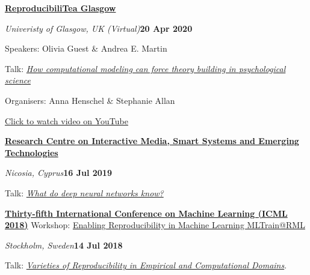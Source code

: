 \documentclass[10pt]{article}
\newenvironment{outerlist}[1][\enskip\textbullet]%
        {\begin{itemize}[#1]}{\end{itemize}%
         \vspace{-.6\baselineskip}}
\newenvironment{innerlist}[1][\enskip\textbullet]%
        {\begin{compactitem}[#1]}{\end{compactitem}}
\begin{document}
\textbf{\href{https://github.com/annahensch/Glasgow-ReproducibiliTea}{ReproducibiliTea Glasgow}} 
\begin{outerlist}
  \item[] \textit{Univeristy of Glasgow, UK (Virtual)}\hfill\textbf{20 Apr 2020}
  \begin{innerlist}
    \item Speakers: Olivia Guest \& Andrea E. Martin
    \item Talk: \textit{\href{https://www.youtube.com/watch?v=_WV7EFvFAB8}{How computational modeling can force theory building in psychological science}}
    \item Organisers: Anna Henschel \& Stephanie Allan
    \item \href{https://youtu.be/_WV7EFvFAB8}{Click to watch video on YouTube}

  \end{innerlist}
\end{outerlist}
\vspace{8pt}
\begin{samepage}

\textbf{\href{http://www.rise.org.cy/en-gb/}{Research Centre on Interactive Media, Smart Systems and Emerging Technologies}}
\begin{outerlist}
  \item[] \textit{Nicosia, Cyprus}\hfill\textbf{16 Jul 2019}
  \begin{innerlist}
    \item Talk: \textit{\href{https://dx.doi.org/10.1101/626374}{What do deep neural networks know?}}
  \end{innerlist}
\end{outerlist}
\vspace{8pt}
\end{samepage}

\begin{samepage}

\textbf{\href{https://icml.cc}{Thirty-fifth International Conference on Machine Learning (ICML 2018)}}
\newline Workshop: \href{https://mltrain.cc/events/enabling-reproducibility-in-machine-learning-mltrainrml-icml-2018/}{Enabling Reproducibility in Machine Learning MLTrain@RML}
\begin{outerlist}
  \item[] \textit{Stockholm, Sweden}\hfill\textbf{14 Jul 2018}
  \begin{innerlist}
    \item Talk:  \textit{\href{https://figshare.com/articles/Varieties_of_Reproducibility_in_Empirical_and_Computational_Domains/6818018}{Varieties of Reproducibility in Empirical and Computational Domains}}.
  \end{innerlist}
\end{outerlist}
\vspace{8pt}\end{samepage}
\end{document}
